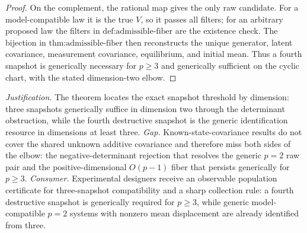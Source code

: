 \documentclass{article}
\begin{document}
\begin{proof}
On the complement, the rational map gives the only raw candidate.  For a model-compatible law it is the true \(V\), so it passes all filters; for an arbitrary proposed law the filters in \(\text{def:admissible-fiber}\) are the existence check.  The bijection in \(\text{thm:admissible-fiber}\) then reconstructs the unique generator, latent covariance, measurement covariance, equilibrium, and initial mean.  Thus a fourth snapshot is generically necessary for \(p\ge3\) and generically sufficient on the cyclic chart, with the stated dimension-two elbow.
\end{proof}
\par\smallskip\noindent \textit{Justification.} The theorem locates the exact snapshot threshold by dimension: three snapshots generically suffice in dimension two through the determinant obstruction, while the fourth destructive snapshot is the generic identification resource in dimensions at least three. \textit{Gap.} Known-state-covariance results do not cover the shared unknown additive covariance and therefore miss both sides of the elbow: the negative-determinant rejection that resolves the generic \(p=2\) raw pair and the positive-dimensional \(O(p-1)\) fiber that persists generically for \(p\ge3\). \textit{Consumer.} Experimental designers receive an observable population certificate for three-snapshot compatibility and a sharp collection rule: a fourth destructive snapshot is generically required for \(p\ge3\), while generic model-compatible \(p=2\) systems with nonzero mean displacement are already identified from three.
\end{document}

